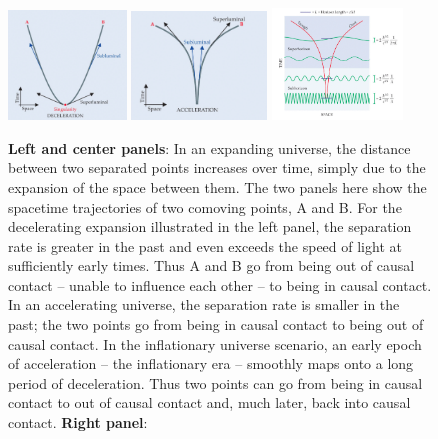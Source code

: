 \begin{figure}[ht]
\centering
\includegraphics[width=0.28\textwidth]{Inflation/CausalStructureDeceleration.png}
\includegraphics[width=0.32\textwidth]{Inflation/CausalStructureAcceleration.png}
\includegraphics[width=0.31\textwidth]{Inflation/QuantumFluctuationsCropped.png}
\caption{{\bf Left and center panels}: In an expanding universe, the distance between two separated points increases over time, simply due to the expansion of the space between them. The two panels here show the spacetime trajectories of two comoving points, A and B. For the decelerating expansion illustrated in the left panel, the separation rate is greater in the past and even exceeds the speed of light at sufficiently early times. Thus A and B go from being out of causal contact -- unable to influence each other -- to being in causal contact. In an accelerating universe, the separation rate is smaller in the past; the two points go from being in causal contact to being out of causal contact. In the inflationary universe scenario, an early epoch of acceleration -- the inflationary era -- smoothly maps onto a long period of deceleration. Thus two points can go from being in causal contact to out of causal contact and, much later, back into causal contact. {\bf Right panel}:
}
\end{figure}
